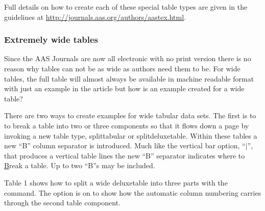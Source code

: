 \documentclass[linenumbers,trackchanges]{aastex7}
\begin{document}
Full details on how to create each of these special table types are given in the guidelines at \url{http://journals.aas.org/authors/aastex.html}.

\subsubsection{Extremely wide tables}

Since the AAS Journals are now all electronic with no print version there is no reason why tables can not be as wide as authors need them to be. For wide tables, the full table will almost always be available in machine readable format with just an example in the article but how is an example created for a wide table?

There are two ways to create examples for wide tabular data sets. The first is to to break a table into two or three components so that it flows down a page by invoking a new table type, splittabular or splitdeluxetable. Within these tables a new ``B'' column separator is introduced.  Much like the vertical bar option, ``$\vert$'', that produces a vertical table lines the new ``B'' separator indicates where to \underline{B}reak a table.  Up to two ``B''s may be included.

Table 1 shows how to split a wide deluxetable into three parts with
the {\tt\string\splitdeluxetable} command.  The {\tt\string\colnumbers}
option is on to show how the automatic column numbering carries through the
second table component.
\end{document}
